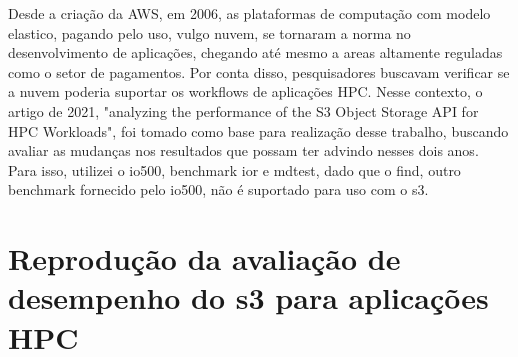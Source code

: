 \documentclass[article,a4paper,12pt,brazil,sumario=tradicional]{abntex2}
\begin{document}
Desde a criação da AWS, em 2006, as plataformas de computação com modelo elastico, pagando pelo uso, vulgo nuvem, se tornaram a norma no desenvolvimento de aplicações, chegando até mesmo a areas altamente reguladas como o setor de pagamentos. Por conta disso, pesquisadores buscavam verificar se a nuvem poderia suportar os workflows de aplicações HPC. Nesse contexto, o artigo de 2021, "analyzing the performance of the S3 Object Storage API for HPC Workloads", foi tomado como base para realização desse trabalho, buscando avaliar as mudanças nos resultados que possam ter advindo nesses dois anos. Para isso, utilizei o io500, benchmark ior e mdtest, dado que o find, outro benchmark fornecido pelo io500, não é suportado para uso com o s3. 

\section{Reprodução da avaliação de desempenho do s3 para aplicações HPC}
\end{document}
